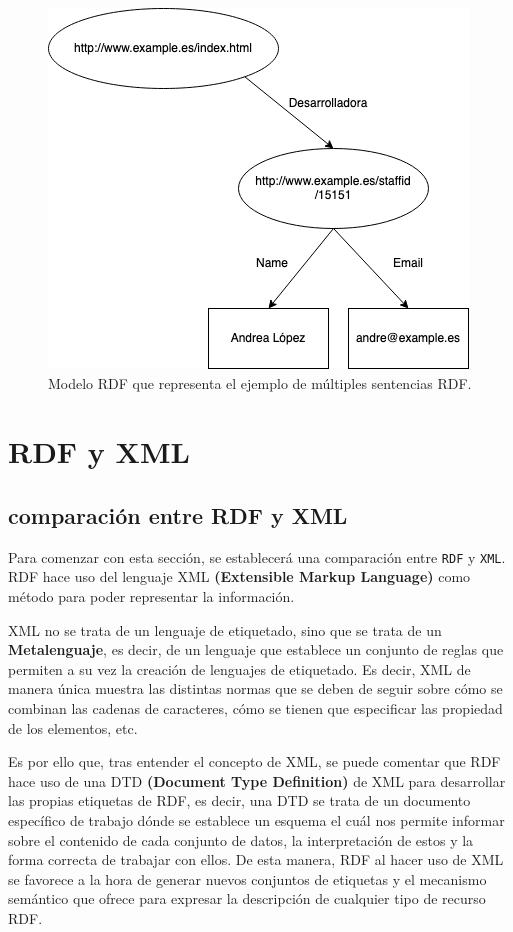 \documentclass[11pt]{report}
\begin{document}
\begin{figure}[H]
	\centering
	\includegraphics[scale=0.7]{../img/Modelo-RDF.png}
	\caption{Modelo RDF que representa el ejemplo de múltiples sentencias RDF.}
	\label{fig:Modelo-RDF}
\end{figure}

\chapter{RDF y XML}

\section{comparación entre RDF y XML}

Para comenzar con esta sección,  se establecerá una comparación entre \texttt{RDF} y \texttt{XML}. RDF hace uso del lenguaje XML \textbf{(Extensible Markup Language)} como método para poder representar la información.

XML no se trata de un lenguaje de etiquetado, sino que se trata de un \textbf{Metalenguaje}, es decir, de un lenguaje que establece un conjunto de reglas que permiten a su vez la creación de lenguajes de etiquetado. Es decir, XML de manera única muestra las distintas normas que se deben de seguir sobre cómo se combinan las cadenas de caracteres, cómo se tienen que especificar las propiedad de los elementos, etc.

Es por ello que, tras entender el concepto de XML, se puede comentar que RDF hace uso de una DTD \textbf{(Document Type Definition)} de XML para desarrollar las propias etiquetas de RDF, es decir, una DTD se trata de un documento específico de trabajo dónde se establece un esquema el cuál nos permite informar sobre el contenido de cada conjunto de datos, la interpretación de estos y la forma correcta de trabajar con ellos. De esta manera, RDF al hacer uso de XML se favorece a la hora de generar nuevos conjuntos de etiquetas y el mecanismo semántico que ofrece para expresar la descripción de cualquier tipo de recurso RDF.
\end{document}

